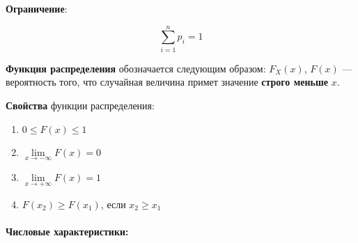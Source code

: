 \documentclass{article}
\begin{document}
\textbf{Ограничение}:

$$
\sum\limits_{i = 1}^{n} p_{i} = 1
$$

\textbf{Функция распределения} обозначается следующим образом: $F_{X}(x)$, $F(x)$ — вероятность того, что случайная величина примет значение \textbf{строго меньше} $x$.

\textbf{Свойства} функции распределения:

\begin{multicols}{2}
\begin{enumerate}
    \item $0 \le F(x) \le 1$
    \item $\lim\limits_{x \to -\infty} F(x) = 0$
    \item $\lim\limits_{x \to +\infty} F(x) = 1$
    \item $F(x_2) \ge F(x_1)$, если $x_2 \ge x_1$
\end{enumerate}
\end{multicols}

\paragraph{Числовые характеристики:}
\end{document}
